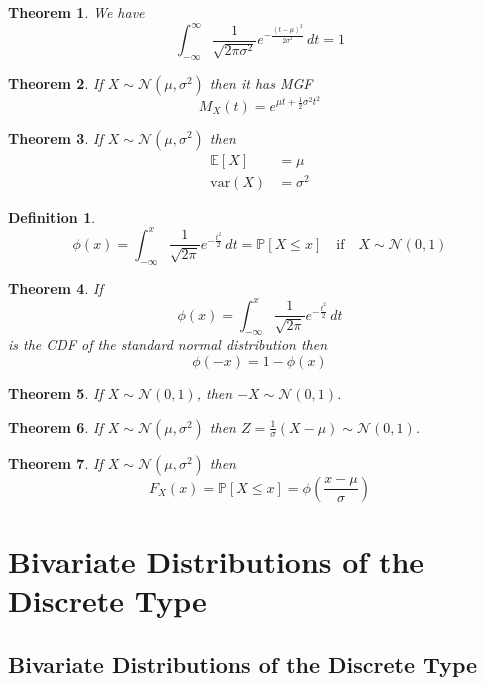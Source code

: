 \documentclass{article}
\newcommand{\PP}{\mathbb{P}}
\newcommand{\E}{\mathbb{E}}
\newcommand{\var}{\text{var}}
\theoremstyle{plain}
\newtheorem{thm}{Theorem}[section]
\theoremstyle{definition}
\newtheorem{defn}{Definition}[section]
\theoremstyle{remark}
\begin{document}
\begin{thm}
    We have \[\int_{-\infty}^\infty\frac{1}{\sqrt{2\pi\sigma^2}}e^{-\frac{(t-\mu)^2}{2\sigma^2}}\,dt=1\]
\end{thm}

\begin{thm}
    If $X\sim\mathcal{N}(\mu,\sigma^2)$ then it has MGF \[M_X(t)=e^{\mu t + \frac{1}{2}\sigma^2t^2}\]
\end{thm}

\begin{thm}
    If $X\sim\mathcal{N}(\mu,\sigma^2)$ then
    \begin{align*}
        \E[X]&=\mu\\
        \var(X)&=\sigma^2
    \end{align*}
\end{thm}

\begin{defn}
    \[\phi(x)=\int_{-\infty}^x\frac{1}{\sqrt{2\pi}}e^{-\frac{t^2}{2}}\,dt=\PP[X\leq x] \quad \text{if} \quad X\sim\mathcal{N}(0,1)\]
\end{defn}

\begin{thm}
    If \[\phi(x)=\int_{-\infty}^x\frac{1}{\sqrt{2\pi}}e^{-\frac{t^2}{2}}\,dt\] is the CDF of the standard normal distribution then \[\phi(-x)=1-\phi(x)\]
\end{thm}

\begin{thm}
    If $X\sim\mathcal{N}(0,1)$, then $-X\sim\mathcal{N}(0,1)$.
\end{thm}

\begin{thm}
    If $X\sim\mathcal{N}(\mu,\sigma^2)$ then $Z=\frac{1}{\sigma}(X-\mu)\sim\mathcal{N}(0,1)$.
\end{thm}

\begin{thm}
    If $X\sim\mathcal{N}(\mu,\sigma^2)$ then \[F_X(x)=\PP[X\leq x]=\phi\left(\frac{x-\mu}{\sigma}\right)\]
\end{thm}

\section{Bivariate Distributions of the Discrete Type}

\subsection{Bivariate Distributions of the Discrete Type}
\end{document}
